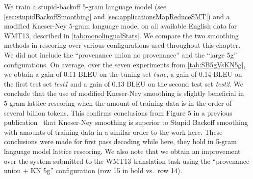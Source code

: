 We train a stupid-backoff 5-gram language
model (see \autoref{sec:stupidBackoffSmoothing}
and \autoref{sec:applicationsMapReduceSMT})
and a modified Kneser-Ney 5-gram language model on all available
English data for WMT13, described in \autoref{tab:monolingualStats}.
We compare the two smoothing methods in rescoring over various
configurations used throughout this chapter. We did not include
the ``provenance union no provenance'' and the ``large 5g'' configurations.
On average, over the seven experiments from \autoref{tab:SB5gVsKN5g},
we obtain a gain of 0.11 BLEU on the tuning set \emph{tune}, a gain of
0.14 BLEU on the first
test set \emph{test1} and a gain of
0.13 BLEU on the second test set \emph{test2}. We conclude that the
use of modified Kneser-Ney smoothing is slightly beneficial in 5-gram
lattice rescoring when the amount of training data is in the order
of several billion tokens. This confirms conclusions from
Figure 5 in a previous publication~\citep{brants-popat-xu-och-dean:2007:EMNLP-CoNLL}
that Kneser-Ney smoothing is superior to Stupid Backoff smoothing
with amounts of training data in a similar order to the work here. These
conclusions were made for first pass decoding while here, they hold in 5-gram
language model lattice rescoring.
We also note that we obtain an improvement over the system submitted to the WMT13 translation
task using the ``provenance union + KN 5g'' configuration (row 15 in bold vs.\ row 14).
%
